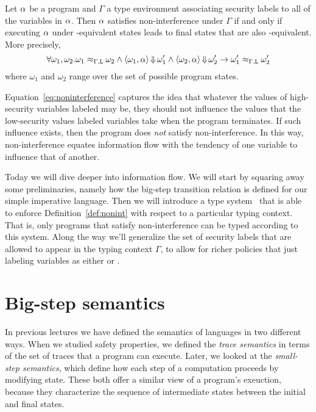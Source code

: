 \documentclass[11pt,twoside]{scrartcl}
\begin{document}
\begin{definition}
\label{def:nonint}
Let $\alpha$ be a program and $\Gamma$ a type environment associating security labels to all of the variables in $\alpha$. Then $\alpha$ satisfies non-interference under $\Gamma$ if and only if executing $\alpha$ under \lowsec-equivalent states leads to final states that are also \lowsec-equivalent. More precisely,
\begin{equation}
\label{eq:noninterference}
\forall \omega_1,\omega_2 . \omega_1 \approx_{\Gamma,\lowsec} \omega_2 \land 
\langle \omega_1, \asprg\rangle \bigstep \omega_1' \land 
\langle \omega_2, \asprg\rangle \bigstep \omega_2'
\limply
\omega_1' \approx_{\Gamma,\lowsec} \omega_2'
\end{equation}
where $\omega_1$ and $\omega_2$ range over the set of possible program states.
\end{definition}

Equation~\ref{eq:noninterference} captures the idea that whatever the values of high-security variables labeled \hisec may be, they should not influence the values that the low-security values labeled \lowsec variables take when the program terminates. If such influence exists, then the program does \emph{not} satisfy non-interference. In this way, non-interference equates information flow with the tendency of one variable to influence that of another.

Today we will dive deeper into information flow. We will start by squaring away some preliminaries, namely how the big-step transition relation is defined for our simple imperative language. Then we will introduce a type system~\cite{Volpano1996} that is able to enforce Definition~\ref{def:nonint} with respect to a particular typing context. That is, only programs that satisfy non-interference can be typed according to this system. Along the way we'll generalize the set of security labels that are allowed to appear in the typing context $\Gamma$, to allow for richer policies that just labeling variables as either \hisec or \lowsec.

\section{Big-step semantics}

In previous lectures we have defined the semantics of languages in two different ways. When we studied safety properties, we defined the \emph{trace semantics} in terms of the set of traces that a program can execute. Later, we looked at the \emph{small-step semantics}, which define how each step of a computation proceeds by modifying state. These both offer a similar view of a program's exeuction, because they characterize the sequence of intermediate states between the initial and final states.
\end{document}
